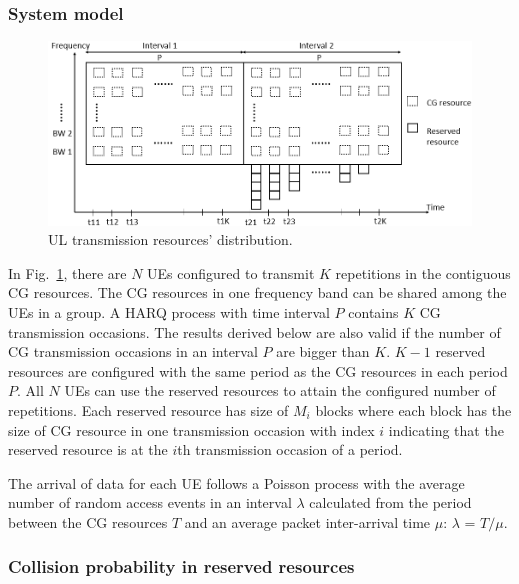 \documentclass{ieeeaccess}
\begin{document}
\subsubsection{System model} \label{IIIB2}

\begin{figure}[htbp]
\centerline{\includegraphics[scale=0.33]{fig6.PNG}}
\caption{UL transmission resources' distribution.}
\label{fig6}
\vspace{-2mm}
\end{figure}



In Fig.~\ref{fig6}, there are $N$ UEs configured to transmit $K$ repetitions in the contiguous CG resources. The CG resources in one frequency band can be shared among the UEs in a group. A HARQ process with time interval $P$ contains $K$ CG transmission occasions. The results derived below are also valid if the number of CG transmission occasions in an interval $P$ are bigger than $K$. $K-1$ reserved resources are configured with the same period as the CG resources in each period $P$. All $N$ UEs can use the reserved resources to attain the configured number of repetitions. Each reserved resource has size of $M_{i}$ blocks where each block has the size of CG resource in one transmission occasion with index $i$ indicating that the reserved resource is at the $i$th transmission occasion of a period. 

The arrival of data for each UE follows a Poisson process with the average number of random access events in an interval $\lambda$ calculated from the period between the CG resources $T$ and an average packet inter-arrival time $\mu$: $\lambda$ = $T/\mu$.

\subsubsection{Collision probability in reserved resources}\label{IIIB3}
\end{document}
